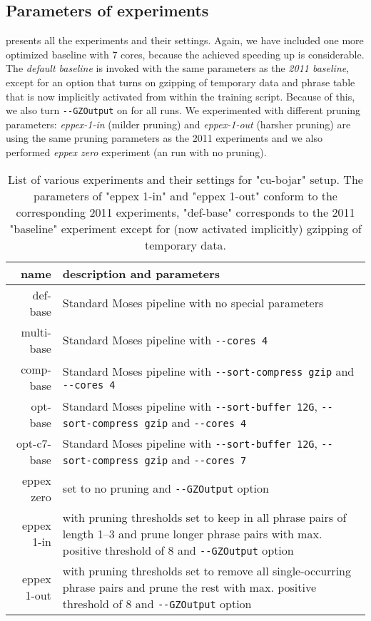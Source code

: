 \subsection{Parameters of experiments}

 presents all the experiments and their settings.
Again, we have included one more optimized baseline with 7 cores, because
the achieved speeding up is considerable.
The \emph{default baseline} is invoked with the same parameters as the \emph{2011
baseline}, except for an option that turns on gzipping of temporary data and
phrase table that is now implicitly activated from within the training script.
Because of this, we also turn \verb|--GZOutput| on for all \eppex{} runs.
We experimented with different pruning parameters: \emph{eppex-1-in} (milder
pruning) and \emph{eppex-1-out} (harsher pruning) are using the same pruning
parameters as the 2011 experiments and we also performed \emph{eppex zero}
experiment (an \eppex{} run with no pruning).

\begin{table}[ht]
\centering
\begin{tabular}{ r p{10cm} }
name & description and parameters \\
\hline
\hline
def-base        & Standard Moses pipeline with no special parameters \\
multi-base      & Standard Moses pipeline with \verb|--cores 4| \\
comp-base       & Standard Moses pipeline with \verb|--sort-compress gzip|
  and \verb|--cores 4| \\
opt-base        & Standard Moses pipeline with \verb|--sort-buffer 12G|,
  \verb|--sort-compress gzip| and \verb|--cores 4| \\
opt-c7-base     & Standard Moses pipeline with \verb|--sort-buffer 12G|,
  \verb|--sort-compress gzip| and \verb|--cores 7| \\
eppex zero      & \eppex{} set to no pruning and \verb|--GZOutput| option \\
eppex 1-in      & \eppex{} with pruning thresholds set to keep in
  all phrase pairs of length 1--3 and prune longer phrase pairs
  with max. positive threshold of 8 and \verb|--GZOutput| option \\
eppex 1-out     & \eppex{} with pruning thresholds set to remove
  all single-occurring phrase pairs and prune the rest with
  max. positive threshold of 8 and \verb|--GZOutput| option \\
\hline
\hline
\end{tabular}
\caption{\label{cu-bojar-scenarios}List of various experiments and their
settings for "cu-bojar" setup. The parameters of "eppex 1-in" and "eppex 1-out"
conform to the corresponding 2011 experiments, "def-base" corresponds to the 2011
"baseline" experiment except for (now activated implicitly) gzipping of
temporary data.}
\end{table}

